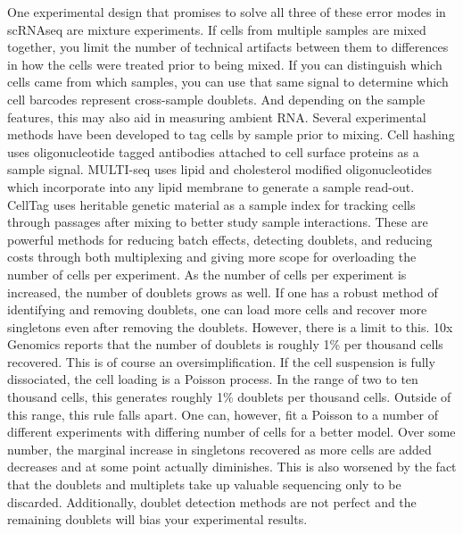 \par{
One experimental design that promises to solve all three of these error modes in scRNAseq are mixture experiments. If cells from multiple samples are mixed together, you limit the number of technical artifacts between them to differences in how the cells were treated prior to being mixed. If you can distinguish which cells came from which samples, you can use that same signal to determine which cell barcodes represent cross-sample doublets. And depending on the sample features, this may also aid in measuring ambient RNA. Several experimental methods have been developed to tag cells by sample prior to mixing. Cell hashing uses oligonucleotide tagged antibodies attached to cell surface proteins as a sample signal\cite{cellhashing}\cite{nucleimulti}. MULTI-seq uses lipid and cholesterol modified oligonucleotides which incorporate into any lipid membrane to generate a sample read-out\cite{multiseq}. CellTag uses heritable genetic material as a sample index for tracking cells through passages after mixing to better study sample interactions\cite{celltag}. These are powerful methods for reducing batch effects, detecting doublets, and reducing costs through both multiplexing and giving more scope for overloading the number of cells per experiment. As the number of cells per experiment is increased, the number of doublets grows as well. If one has a robust method of identifying and removing doublets, one can load more cells and recover more singletons even after removing the doublets. However, there is a limit to this. 10x Genomics reports that the number of doublets is roughly 1\% per thousand cells recovered. This is of course an oversimplification. If the cell suspension is fully dissociated, the cell loading is a Poisson process. In the range of two to ten thousand cells, this generates roughly 1\% doublets per thousand cells. Outside of this range, this rule falls apart. One can, however, fit a Poisson to a number of different experiments with differing number of cells for a better model. Over some number, the marginal increase in singletons recovered as more cells are added decreases and at some point actually diminishes. This is also worsened by the fact that the doublets and multiplets take up valuable sequencing only to be discarded. Additionally, doublet detection methods are not perfect and the remaining doublets will bias your experimental results. 
} 

